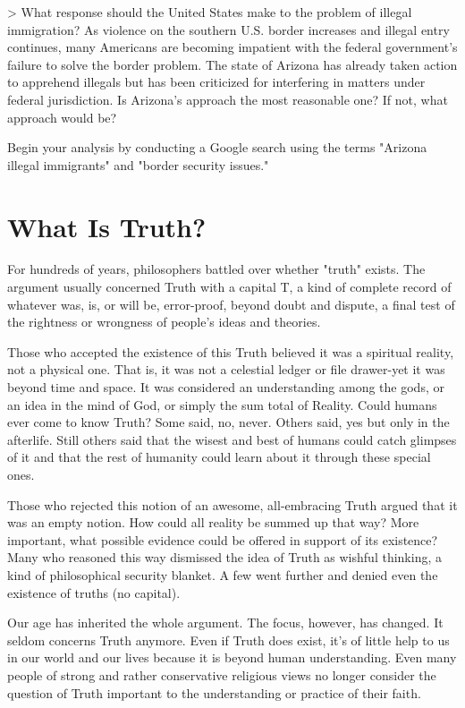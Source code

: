 \documentclass{book}
\begin{document}
> What response should the United States make to the problem of illegal immigration? As violence on the southern U.S. border increases and illegal entry continues, many Americans are becoming impatient with the federal government’s failure to solve the border problem. The state of Arizona has already taken action to apprehend illegals but has been criticized for interfering in matters under federal jurisdiction. Is Arizona’s approach the most reasonable one? If not, what approach would be? 

Begin your analysis by conducting a Google search using the terms "Arizona illegal immigrants" and "border security issues."

\chapter{What Is Truth?}

For hundreds of years, philosophers battled over whether "truth" exists. The argument usually concerned Truth with a capital T, a kind of complete record of whatever was, is, or will be, error-proof, beyond doubt and dispute, a final test of the rightness or wrongness of people’s ideas and theories.

Those who accepted the existence of this Truth believed it was a spiritual reality, not a physical one. That is, it was not a celestial ledger or file drawer-yet it was beyond time and space. It was considered an understanding among the gods, or an idea in the mind of God, or simply the sum total of Reality. Could humans ever come to know Truth? Some said, no, never. Others said, yes but only in the afterlife. Still others said that the wisest and best of humans could catch glimpses of it and that the rest of humanity could learn about it through these special ones.

Those who rejected this notion of an awesome, all-embracing Truth argued that it was an empty notion. How could all reality be summed up that way? More important, what possible evidence could be offered in support of its existence? Many who reasoned this way dismissed the idea of Truth as wishful thinking, a kind of philosophical security blanket. A few went further and denied even the existence of truths (no capital).

Our age has inherited the whole argument. The focus, however, has changed. It seldom concerns Truth anymore. Even if Truth does exist, it’s of little help to us in our world and our lives because it is beyond human understanding. Even many people of strong and rather conservative religious views no longer consider the question of Truth important to the understanding or practice of their faith.
\end{document}
